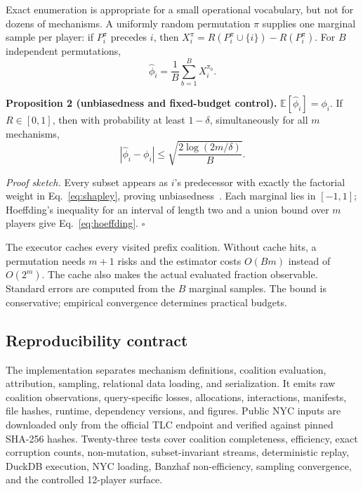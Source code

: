 \documentclass[conference]{IEEEtran}
\begin{document}
Exact enumeration is appropriate for a small operational vocabulary, but not for dozens of mechanisms. A uniformly random permutation $\pi$ supplies one marginal sample per player: if $P_i^\pi$ precedes $i$, then $X_i^\pi=R(P_i^\pi\cup\{i\})-R(P_i^\pi)$. For $B$ independent permutations,
\begin{equation}
 \widehat\phi_i=\frac{1}{B}\sum_{b=1}^B X_i^{\pi_b}.
\end{equation}

\textbf{Proposition 2 (unbiasedness and fixed-budget control).} $\mathbb{E}[\widehat\phi_i]=\phi_i$. If $R\in[0,1]$, then with probability at least $1-\delta$, simultaneously for all $m$ mechanisms,
\begin{equation}
 |\widehat\phi_i-\phi_i|\le
 \sqrt{\frac{2\log(2m/\delta)}{B}}.
 \label{eq:hoeffding}
\end{equation}

\emph{Proof sketch.} Every subset appears as $i$'s predecessor with exactly the factorial weight in Eq.~\ref{eq:shapley}, proving unbiasedness~\cite{castro2009sampling}. Each marginal lies in $[-1,1]$; Hoeffding's inequality for an interval of length two and a union bound over $m$ players give Eq.~\ref{eq:hoeffding}. \hfill$\square$

The executor caches every visited prefix coalition. Without cache hits, a permutation needs $m+1$ risks and the estimator costs $O(Bm)$ instead of $O(2^m)$. The cache also makes the actual evaluated fraction observable. Standard errors are computed from the $B$ marginal samples. The bound is conservative; empirical convergence determines practical budgets.

\subsection{Reproducibility contract}

The implementation separates mechanism definitions, coalition evaluation, attribution, sampling, relational data loading, and serialization. It emits raw coalition observations, query-specific losses, allocations, interactions, manifests, file hashes, runtime, dependency versions, and figures. Public NYC inputs are downloaded only from the official TLC endpoint and verified against pinned SHA-256 hashes. Twenty-three tests cover coalition completeness, efficiency, exact corruption counts, non-mutation, subset-invariant streams, deterministic replay, DuckDB execution, NYC loading, Banzhaf non-efficiency, sampling convergence, and the controlled 12-player surface.
\end{document}
